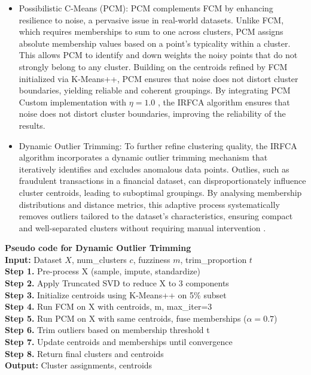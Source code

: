 \documentclass[twoside,11pt]{article}
\renewcommand{\cite}{\citep}
\begin{document}
\begin{itemize}[nosep]
        \item Possibilistic C-Means (PCM): PCM complements FCM by enhancing resilience to noise, a pervasive issue in real-world datasets. Unlike FCM, which requires memberships to sum to one across clusters, PCM assigns absolute membership values based on a point’s typicality within a cluster. This allows PCM to identify and down weights the noisy points that do not strongly belong to any cluster. Building on the centroids refined by FCM initialized via K-Means++, PCM ensures that noise does not distort cluster boundaries, yielding reliable and coherent groupings. By integrating PCM Custom implementation with $\eta = 1.0$ \cite{krishnapuram1993}, the IRFCA algorithm ensures that noise does not distort cluster boundaries, improving the reliability of the results.
        \item Dynamic Outlier Trimming: To further refine clustering quality, the IRFCA algorithm incorporates a dynamic outlier trimming mechanism that iteratively identifies and excludes anomalous data points. Outlies, such as fraudulent transactions in a financial dataset, can disproportionately influence cluster centroids, leading to suboptimal groupings. By analysing membership distributions and distance metrics, this adaptive process systematically removes outliers tailored to the dataset’s characteristics, ensuring compact and well-separated clusters without requiring manual intervention \cite{song2021,dorabiala2021}.
    \end{itemize}

\begin{center}
\begin{minipage}{0.8\textwidth} %
\justifying
\textbf{Pseudo code for Dynamic Outlier Trimming}\\
\textbf{Input:} Dataset $X$, num\_clusters $c$, fuzziness $m$, trim\_proportion $t$\\
\textbf{Step 1.} Pre-process X (sample, impute, standardize)\\
\textbf{Step 2.} Apply Truncated SVD to reduce X to 3 components\\
\textbf{Step 3.} Initialize centroids using K-Means++ on 5\% subset\\
\textbf{Step 4.} Run FCM on X with centroids, m, max\_iter=3\\
\textbf{Step 5.} Run PCM on X with same centroids, fuse memberships ($\alpha = 0.7$)\\
\textbf{Step 6.} Trim outliers based on membership threshold t\\
\textbf{Step 7.} Update centroids and memberships until convergence\\
\textbf{Step 8.} Return final clusters and centroids\\
\textbf{Output:} Cluster assignments, centroids\\
\end{minipage}
\end{center}
\end{document}
